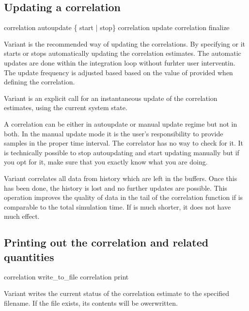 \subsection{Updating a correlation}
\begin{essyntax}
 correlation  autoupdate \{ start | stop\} 
 correlation  update 
 correlation  finalize
\end{essyntax}

Variant  is the recommended way of updating the correlations.
By specifying  or  it starts or stops automatically
updating the correlation estimates. The automatic updates are done
within the integration loop without furhter user interventin.
The update frequency is adjusted based based on the value of  
provided when defining the correlation.  

Variant  is an explicit call for an instantaneous 
update of the correlation estimates, using the current system
state.

A correlation can be either in autoupdate or manual update regime but
not in both.  In the manual update mode it is the user's
responsibility to provide samples in the proper time interval. The
correlator has no way to check for it.  It is technically possible to
stop autoupdating and start updating manually but if you opt for it,
make sure that you exactly know what you are doing.

Variant  correlates all data from history which are left in
the buffers. Once this has been done, the history is lost and no
further updates are possible. This operation improves the quality of
data in the tail of the  
correlation function if  is comparable to the total
simulation time. If  is much shorter, it does not
have much effect.



\subsection{Printing out the correlation and related quantities}
\begin{essyntax}
 correlation  write_to_file 
 correlation  print 
\end{essyntax}

Variant  writes the current status of the correlation
estimate to the specified filename. If the file exists, its contents will
be owerwritten.

